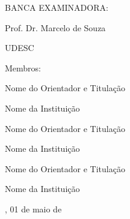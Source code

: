 

%
% 
%
\begin{folhadeaprovacao}



	\begin{center}
		{\selectfont\MakeTextUppercase{\normalsize\imprimirautor}}
	\end{center}
	\vfill

	\vfill
	\begin{center}
		{\selectfont\MakeTextUppercase{\imprimirtitulo}}
	\end{center}
	\vfill




	\vfill

	\begin{center}

		{\selectfont BANCA EXAMINADORA: }
		\vspace*{1.75cm}

		Prof. Dr. Marcelo de Souza \par
		UDESC
	\end{center}

	{Membros:}

	\begin{center}
		\vspace*{1.25cm}
		Nome do Orientador e Titulação \par
		Nome da Instituição

		\vspace*{1.25cm}
		Nome do Orientador e Titulação \par
		Nome da Instituição

		\vspace*{1.25cm}
		Nome do Orientador e Titulação \par
		Nome da Instituição


	\end{center}

	\vspace*{\fill}
	\begin{center}
		{\imprimirlocal, 01 de maio de \imprimirdata}
	\end{center}
	\vspace*{0.25cm}
\end{folhadeaprovacao}





